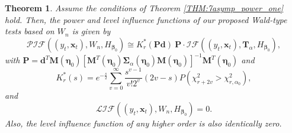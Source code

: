 \documentclass[a4paper]{article}%
\newtheorem{theorem}{Theorem}
\begin{document}
\begin{theorem}
\label{Theorem10} Assume the conditions of Theorem \ref{THM:7asymp_power_one}
hold. Then, the power and level influence functions of our proposed
Wald-type tests based on $W_{n}$ is given by
\begin{equation}
\mathcal{PIF}((y_{t},\boldsymbol{x}_{t}),W_{n},H_{\boldsymbol{\beta}_{0}})
\cong K_{r}^{\ast}\left(  \boldsymbol{P}\mathbf{d}\right)  ~ \boldsymbol{P}%
\cdot\mathcal{IF}((y_{t},\boldsymbol{x}_{t}),\boldsymbol{T}_{\alpha
},H_{\boldsymbol{\beta}_{0}}), \label{EQ:7PIF_simpleTest1}%
\end{equation}
with $\boldsymbol{P} = \boldsymbol{d}^{T}\boldsymbol{M}\left( \boldsymbol{\eta
}_{0}\right)  \left[ \boldsymbol{M}^{T}\left( \boldsymbol{\eta}_{0}\right)
\boldsymbol{\Sigma}_{\alpha}\left( \boldsymbol{\eta}_{0}\right)
\boldsymbol{M}\left(  \boldsymbol{\eta}_{0}\right)  \right] ^{-1}%
\boldsymbol{M}^{T}\left(  \boldsymbol{\eta}_{0}\right) $ and
\[
K_{r}^{\ast}(s)=e^{-\frac{s}{2}}\sum\limits_{v=0}^{\infty}\frac{s^{v-1}
}{v!2^{v}}\left(  2v-s\right)  P\left(  \chi_{r+2v}^{2}>\chi_{r,\alpha_0}
^{2}\right)  ,
\]
and
\[
\mathcal{LIF}((y_{t},\boldsymbol{x}_{t}),W_{n},H_{\boldsymbol{\beta}_{0}})=0.
\]
Also, the level influence function of any higher order is also identically zero.
\end{theorem}

\end{document}
